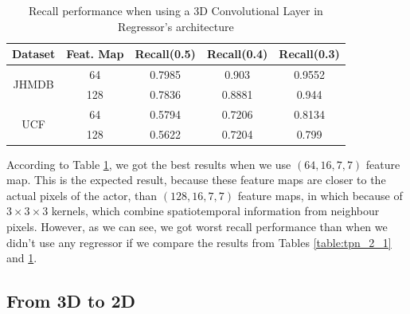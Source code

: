 \begin{table}[h]
  \centering
  \begin{tabular}{||c | c || c  c  c||}
    \hline
    \textbf{Dataset} & \textbf{Feat. Map} & \textbf{Recall(0.5)} & \textbf{Recall(0.4)} & \textbf{Recall(0.3)}\\
    \hline
    \multirow{2}{*}{JHMDB} &  64 & 0.7985 & 0.903 & 0.9552 \\
    \cline{2-5}
    {} & 128 & 0.7836 & 0.8881 & 0.944\\
    \hline
    \multirow{2}{*}{UCF}  & 64 & 0.5794 & 0.7206 & 0.8134 \\
    \cline{2-5}
    {} & 128 & 0.5622 & 0.7204 & 0.799 \\
    \hline

  \end{tabular}
  \caption{Recall performance when using a 3D Convolutional Layer in Regressor's architecture}
  \label{table:reg_2_1}
\end{table}

According to Table \ref{table:reg_2_1}, we got the best results when we use $(64,16,7,7)$ feature map. This is the expected result, because these feature maps
are closer to the actual pixels of the actor, than $(128,16,7,7)$ feature maps, in which because of $3 \times 3 \times 3$ kernels, which combine spatiotemporal
information from neighbour pixels. However, as we can see, we got worst recall performance than when we didn't use any regressor if we compare the results from Tables
\ref{table:tpn_2_1} and \ref{table:reg_2_1}.

\subsection{From 3D to 2D}

